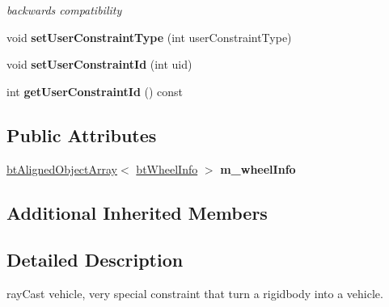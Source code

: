 \begin{DoxyCompactItemize}
\begin{DoxyCompactList}\small\item\em backwards compatibility \end{DoxyCompactList}\item 
\hypertarget{classbt_raycast_vehicle_a552a25a880d5fe75c575800156d591fd}{void {\bfseries set\+User\+Constraint\+Type} (int user\+Constraint\+Type)}\label{classbt_raycast_vehicle_a552a25a880d5fe75c575800156d591fd}

\item 
\hypertarget{classbt_raycast_vehicle_ab894b724e8b19228b7eea8317e0eb43b}{void {\bfseries set\+User\+Constraint\+Id} (int uid)}\label{classbt_raycast_vehicle_ab894b724e8b19228b7eea8317e0eb43b}

\item 
\hypertarget{classbt_raycast_vehicle_a43083c074f8280d05146abf31c2f11ab}{int {\bfseries get\+User\+Constraint\+Id} () const }\label{classbt_raycast_vehicle_a43083c074f8280d05146abf31c2f11ab}

\end{DoxyCompactItemize}
\subsection*{Public Attributes}
\begin{DoxyCompactItemize}
\item 
\hypertarget{classbt_raycast_vehicle_aabfbb662219db326752c7fa6e32da682}{\hyperlink{classbt_aligned_object_array}{bt\+Aligned\+Object\+Array}$<$ \hyperlink{structbt_wheel_info}{bt\+Wheel\+Info} $>$ {\bfseries m\+\_\+wheel\+Info}}\label{classbt_raycast_vehicle_aabfbb662219db326752c7fa6e32da682}

\end{DoxyCompactItemize}
\subsection*{Additional Inherited Members}


\subsection{Detailed Description}
ray\+Cast vehicle, very special constraint that turn a rigidbody into a vehicle. 

